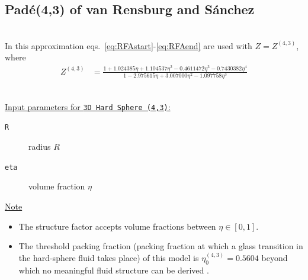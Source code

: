 \clearpage
\subsection{Pad\'{e}(4,3) of van Rensburg and S\'{a}nchez} \cite{Rensburg1993,Sanchez1994} ~\\

\noindent In this approximation eqs.\ \ref{eq:RFAstart}-\ref{eq:RFAend} are used with $Z=Z^{(4,3)}$, where
\begin{align}
Z^{(4,3)} &= \frac{1+1.024385\eta+1.104537\eta^2-0.4611472\eta^3-0.7430382\eta^4}{1-2.975615\eta+3.007000\eta^2-1.097758\eta^3}
\end{align}

\vspace{5mm}

\hspace{1pt}\\
\underline{Input parameters for \texttt{3D Hard Sphere (4,3)}:}
\begin{description}
    \item[\texttt{R}]  radius $R$
    \item[\texttt{eta}] volume fraction $\eta$
\end{description}

\noindent
\underline{Note}
\begin{itemize}
\item The structure factor accepts volume fractions between $\eta \in [0,1]$.
\item The threshold packing fraction (packing
fraction at which a glass transition in the hard-sphere fluid takes place) of this model is $\eta^{(4,3)}_0 = 0.5604$  beyond
which no meaningful fluid structure can be derived \cite{Haro2004}.
\end{itemize}

